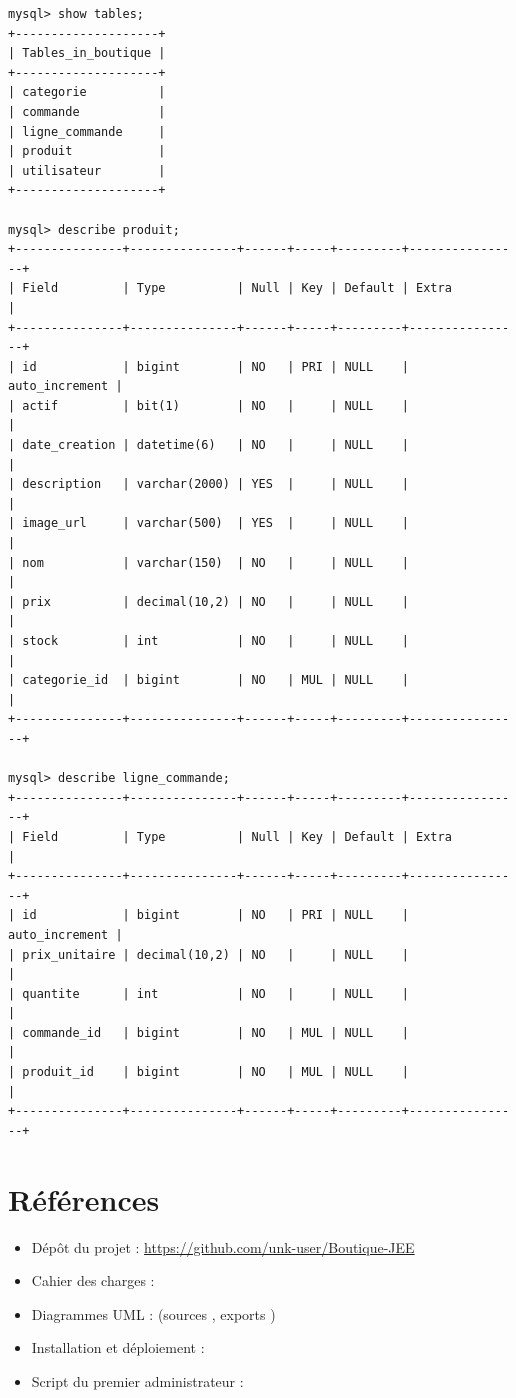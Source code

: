 {\footnotesize
\begin{verbatim}
mysql> show tables;
+--------------------+
| Tables_in_boutique |
+--------------------+
| categorie          |
| commande           |
| ligne_commande     |
| produit            |
| utilisateur        |
+--------------------+

mysql> describe produit;
+---------------+---------------+------+-----+---------+----------------+
| Field         | Type          | Null | Key | Default | Extra          |
+---------------+---------------+------+-----+---------+----------------+
| id            | bigint        | NO   | PRI | NULL    | auto_increment |
| actif         | bit(1)        | NO   |     | NULL    |                |
| date_creation | datetime(6)   | NO   |     | NULL    |                |
| description   | varchar(2000) | YES  |     | NULL    |                |
| image_url     | varchar(500)  | YES  |     | NULL    |                |
| nom           | varchar(150)  | NO   |     | NULL    |                |
| prix          | decimal(10,2) | NO   |     | NULL    |                |
| stock         | int           | NO   |     | NULL    |                |
| categorie_id  | bigint        | NO   | MUL | NULL    |                |
+---------------+---------------+------+-----+---------+----------------+

mysql> describe ligne_commande;
+---------------+---------------+------+-----+---------+----------------+
| Field         | Type          | Null | Key | Default | Extra          |
+---------------+---------------+------+-----+---------+----------------+
| id            | bigint        | NO   | PRI | NULL    | auto_increment |
| prix_unitaire | decimal(10,2) | NO   |     | NULL    |                |
| quantite      | int           | NO   |     | NULL    |                |
| commande_id   | bigint        | NO   | MUL | NULL    |                |
| produit_id    | bigint        | NO   | MUL | NULL    |                |
+---------------+---------------+------+-----+---------+----------------+
\end{verbatim}
}

\chapter{Références}

\begin{itemize}
  \item Dépôt du projet : \url{https://github.com/unk-user/Boutique-JEE}
  \item Cahier des charges : 
  \item Diagrammes UML :  (sources , exports )
  \item Installation et déploiement : 
  \item Script du premier administrateur : 
\end{itemize}

